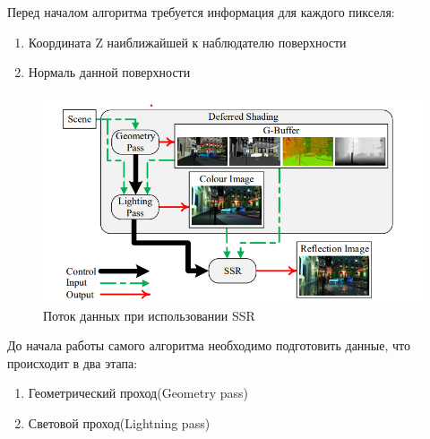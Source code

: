 \documentclass[a4paper,14pt,unknownkeysallowed]{extreport}
\begin{document}
Перед началом алгоритма требуется информация для каждого пикселя:
\begin{enumerate}
	\item Координата Z наиближайшей к наблюдателю поверхности
	\item Нормаль данной поверхности
\end{enumerate}

\begin{figure}[H]
	\centering
	\includegraphics{SSR_data_flow.png}
	\caption{Поток данных при использовании SSR}
	\label{fig:SSR_data_flow}
\end{figure} 

До начала работы самого алгоритма необходимо подготовить данные, что происходит в два этапа:
\begin{enumerate}
	\item Геометрический проход(Geometry pass)
	\item Световой проход(Lightning pass)
\end{enumerate}
\end{document}

